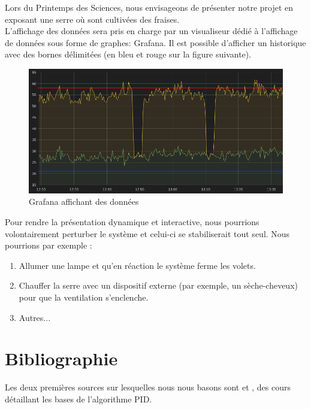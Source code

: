 \documentclass[a4paper,10pt]{article}
\begin{document}
Lors du Printemps des Sciences, nous envisageons de présenter notre projet en exposant une serre où sont cultivées des fraises. \\

L'affichage des données sera pris en charge par un visualiseur dédié à l'affichage de données sous forme de graphes: Grafana. Il est possible d'afficher un historique avec des bornes délimitées (en bleu et rouge sur la figure suivante). \\

\thispagestyle{empty}
\begin{figure}[H]
\centering
\includegraphics[scale=0.5]{figures/Grafana.png}
\caption{Grafana affichant des données}
\label{grafana}
\end{figure}

Pour rendre la présentation dynamique et interactive, nous pourrions volontairement perturber le système et celui-ci se stabiliserait tout seul. Nous pourrions par exemple :
\begin{enumerate}
	\item Allumer une lampe et qu'en réaction le système ferme les volets.
	\item Chauffer la serre avec un dispositif externe (par exemple, un sèche-cheveux) pour que la ventilation s'enclenche.
	\item Autres... \\
\end{enumerate}

\section{Bibliographie}

Les deux premières sources sur lesquelles nous nous basons sont  \cite{Kinnaert2013} et  \cite{Knospe2006}, des cours détaillant les bases de l'algorithme PID. \\
\end{document}
